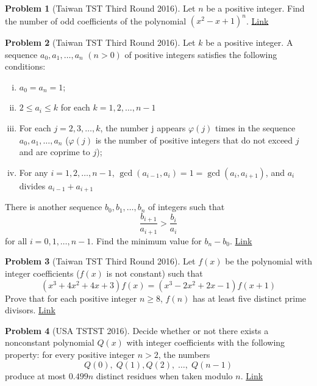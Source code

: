 \documentclass[]{article}
\theoremstyle{definition}
\newtheorem{problem}{Problem}
\begin{document}
\begin{problem}[Taiwan TST Third Round 2016]
	Let $n$ be a positive integer. Find the number of odd coefficients of the polynomial $(x^2-x+1)^n$. \hfill \href{http://artofproblemsolving.com/community/c6h1275931p6691592}{Link}
\end{problem}



\begin{problem}[Taiwan TST Third Round 2016]
	Let $k$ be a positive integer. A sequence $a_0, a_1, \dots, a_n$ $(n>0)$ of positive integers satisfies the following conditions:
	\begin{enumerate}[(i)]
		\item $a_0=a_n=1$;
		\item $2\leq a_i\leq k$ for each $k=1,2,\dots,n-1$
		\item For each $j=2,3,\dots,k$, the number j appears $\varphi (j)$ times in the sequence $a_0,a_1,\dots,a_n$ ($\varphi (j)$ is the number of positive integers that do not exceed $j$ and are coprime to $j$);
		\item For any $i=1,2,\dots,n-1$, $\gcd(a_{i-1},a_i)=1=\gcd(a_i,a_{i+1})$, and $a_i$ divides $a_{i-1}+a_{i+1}$
	\end{enumerate}
	There is another sequence $b_0,b_1,\dots,b_n$ of integers such that $$\frac{b_{i+1}}{a_{i+1}}>\frac{b_i}{a_i}$$ for all $i=0,1,\dots,n-1$. Find the minimum value for $b_n-b_0$. \hfill \href{http://www.artofproblemsolving.com/community/c6h1232316p6236640}{Link}
\end{problem}



\begin{problem}[Taiwan TST Third Round 2016]
	Let $f(x)$ be the polynomial with integer coefficients ($f(x)$ is not constant) such that
	\[(x^3+4x^2+4x+3)f(x)=(x^3-2x^2+2x-1)f(x+1)\]Prove that for each positive integer $n\geq8$, $f(n)$ has at least five distinct prime divisors. \hfill \href{http://artofproblemsolving.com/community/c6h1278533p6716098}{Link}
\end{problem}



\begin{problem}[USA TSTST 2016]
	Decide whether or not there exists a nonconstant polynomial $Q(x)$ with integer coefficients with the following property: for every positive integer $n > 2$, the numbers \[ Q(0), \; Q(1), Q(2), \; \dots, \; Q(n-1) \]produce at most $0.499n$ distinct residues when taken modulo $n$. \hfill \href{http://artofproblemsolving.com/community/c6h1264175p6575217}{Link}
\end{problem}
\end{document}
